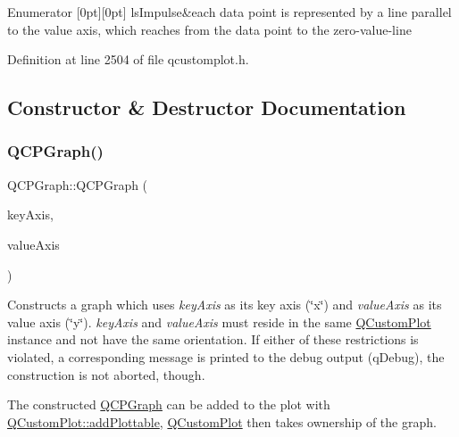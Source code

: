 \begin{DoxyEnumFields}{Enumerator}
[0pt][0pt]{}\mbox{\label{class_q_c_p_graph_ad60175cd9b5cac937c5ee685c32c0859aa3b358b4ae7cca94aceeb8e529c12ebb}} 
ls\+Impulse&each data point is represented by a line parallel to the value axis, which reaches from the data point to the zero-\/value-\/line \\
\hline

\end{DoxyEnumFields}


Definition at line 2504 of file qcustomplot.\+h.



\subsection{Constructor \& Destructor Documentation}
\mbox{\label{class_q_c_p_graph_a0393a38cf7183cbf46348eb6cf9a5a6c}} 
\subsubsection{\texorpdfstring{Q\+C\+P\+Graph()}{QCPGraph()}}
{\footnotesize\ttfamily Q\+C\+P\+Graph\+::\+Q\+C\+P\+Graph (\begin{DoxyParamCaption}\item[{\hyperlink{class_q_c_p_axis}{Q\+C\+P\+Axis} $\ast$}]{key\+Axis,  }\item[{\hyperlink{class_q_c_p_axis}{Q\+C\+P\+Axis} $\ast$}]{value\+Axis }\end{DoxyParamCaption})\hspace{0.3cm}{\ttfamily [explicit]}}

Constructs a graph which uses {\itshape key\+Axis} as its key axis (\char`\"{}x\char`\"{}) and {\itshape value\+Axis} as its value axis (\char`\"{}y\char`\"{}). {\itshape key\+Axis} and {\itshape value\+Axis} must reside in the same \hyperlink{class_q_custom_plot}{Q\+Custom\+Plot} instance and not have the same orientation. If either of these restrictions is violated, a corresponding message is printed to the debug output (q\+Debug), the construction is not aborted, though.

The constructed \hyperlink{class_q_c_p_graph}{Q\+C\+P\+Graph} can be added to the plot with \hyperlink{class_q_custom_plot_ab7ad9174f701f9c6f64e378df77927a6}{Q\+Custom\+Plot\+::add\+Plottable}, \hyperlink{class_q_custom_plot}{Q\+Custom\+Plot} then takes ownership of the graph.

